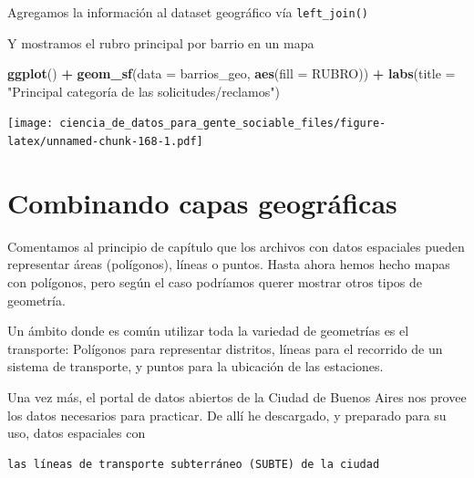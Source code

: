 \documentclass[spanish,]{book}
\newenvironment{Shaded}{\begin{snugshade}}{\end{snugshade}}
\newcommand{\DataTypeTok}[1]{\textcolor[rgb]{0.13,0.29,0.53}{#1}}
\newcommand{\KeywordTok}[1]{\textcolor[rgb]{0.13,0.29,0.53}{\textbf{#1}}}
\newcommand{\NormalTok}[1]{#1}
\newcommand{\OperatorTok}[1]{\textcolor[rgb]{0.81,0.36,0.00}{\textbf{#1}}}
\newcommand{\StringTok}[1]{\textcolor[rgb]{0.31,0.60,0.02}{#1}}
\begin{document}
Agregamos la información al dataset geográfico vía \texttt{left\_join()}

\begin{Shaded}
\end{Shaded}

Y mostramos el rubro principal por barrio en un mapa

\begin{Shaded}
\begin{Highlighting}[]
\KeywordTok{ggplot}\NormalTok{() }\OperatorTok{+}\StringTok{ }
\StringTok{    }\KeywordTok{geom_sf}\NormalTok{(}\DataTypeTok{data =}\NormalTok{ barrios_geo, }\KeywordTok{aes}\NormalTok{(}\DataTypeTok{fill =}\NormalTok{ RUBRO)) }\OperatorTok{+}
\StringTok{    }\KeywordTok{labs}\NormalTok{(}\DataTypeTok{title =} \StringTok{"Principal categoría de las solicitudes/reclamos"}\NormalTok{)}
\end{Highlighting}
\end{Shaded}

\texttt{[image: ciencia\_de\_datos\_para\_gente\_sociable\_files/figure-latex/unnamed-chunk-168-1.pdf]}

\hypertarget{combinando-capas-geograficas}{%
\section{Combinando capas geográficas}\label{combinando-capas-geograficas}}

Comentamos al principio de capítulo que los archivos con datos espaciales pueden representar áreas (polígonos), líneas o puntos. Hasta ahora hemos hecho mapas con polígonos, pero según el caso podríamos querer mostrar otros tipos de geometría.

Un ámbito donde es común utilizar toda la variedad de geometrías es el transporte: Polígonos para representar distritos, líneas para el recorrido de un sistema de transporte, y puntos para la ubicación de las estaciones.

Una vez más, el portal de datos abiertos de la Ciudad de Buenos Aires nos provee los datos necesarios para practicar. De allí he descargado, y preparado para su uso, datos espaciales con

\begin{verbatim}
las líneas de transporte subterráneo (SUBTE) de la ciudad
\end{verbatim}
\end{document}
